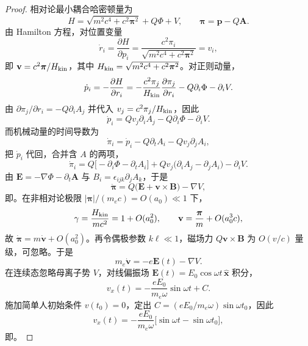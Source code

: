 \begin{proof}
相对论最小耦合哈密顿量为
\begin{equation*}
H=\sqrt{m^2c^4+c^2\boldsymbol\pi^2}+Q\Phi+V,
\qquad
\boldsymbol\pi=\mathbf p-Q\mathbf A.
\end{equation*}
由 Hamilton 方程，对位置变量
\begin{equation*}
\dot r_i=\frac{\partial H}{\partial p_i}
=\frac{c^2\pi_i}{\sqrt{m^2c^4+c^2\boldsymbol\pi^2}}
= v_i,
\end{equation*}
即 $\mathbf v=c^2\boldsymbol\pi/H_{\rm kin}$，其中 $H_{\rm kin}=\sqrt{m^2c^4+c^2\boldsymbol\pi^2}$。对正则动量，
\begin{equation*}
\dot p_i=-\frac{\partial H}{\partial r_i}
= -\frac{c^2\pi_j}{H_{\rm kin}}\frac{\partial\pi_j}{\partial r_i}
 -Q\partial_i\Phi-\partial_iV.
\end{equation*}
由 $\partial\pi_j/\partial r_i=-Q\partial_iA_j$ 并代入 $v_j=c^2\pi_j/H_{\rm kin}$，因此
\begin{equation*}
\dot p_i = Qv_j\partial_iA_j - Q\partial_i\Phi - \partial_iV.
\end{equation*}
而机械动量的时间导数为
\begin{equation*}
\dot\pi_i
= \dot p_i - Q\partial_tA_i - Qv_j\partial_jA_i,
\end{equation*}
把 $\dot p_i$ 代回，合并含 $A$ 的两项，
\begin{equation*}
\dot\pi_i
= Q\bigl[-\partial_i\Phi-\partial_tA_i\bigr]
 + Qv_j\bigl(\partial_iA_j-\partial_jA_i\bigr)
 -\partial_iV.
\end{equation*}
由 $\mathbf E=-\nabla\Phi-\partial_t\mathbf A$ 与 $B_i=\epsilon_{ijk}\partial_jA_k$，于是
\begin{equation*}
\dot{\boldsymbol\pi}
= Q\bigl(\mathbf E+\mathbf v\times\mathbf B\bigr)-\nabla V,
\end{equation*}
即。在非相对论极限 $|\boldsymbol\pi|/(m_ec)=O(a_0)\ll1$ 下，
\begin{equation*}
\gamma = \frac{H_{\rm kin}}{mc^2} = 1+O(a_0^2),
\qquad
\mathbf v = \frac{\boldsymbol\pi}{m}+O(a_0^3 c),
\end{equation*}
故 $\dot{\boldsymbol\pi}=m\dot{\mathbf v}+O(a_0^2)$。再令偶极参数 $k\ell\ll1$，磁场力 $Q\mathbf v\times\mathbf B$ 为 $O(v/c)$ 量级，可忽略。于是
\begin{equation*}
m_e\dot{\mathbf v} = -e\mathbf E(t) - \nabla V.
\end{equation*}
在连续态忽略母离子势 $V$，对线偏振场 $\mathbf E(t)=E_0\cos\omega t\,\hat{\mathbf x}$ 积分，
\begin{equation*}
v_x(t) = -\frac{eE_0}{m_e\omega}\sin\omega t + C.
\end{equation*}
施加简单人初始条件 $v(t_0)=0$，定出 $C=(eE_0/m_e\omega)\sin\omega t_0$，因此
\begin{equation*}
v_x(t) = -\frac{eE_0}{m_e\omega}\bigl[\sin\omega t-\sin\omega t_0\bigr],
\end{equation*}
即。
\end{proof}

